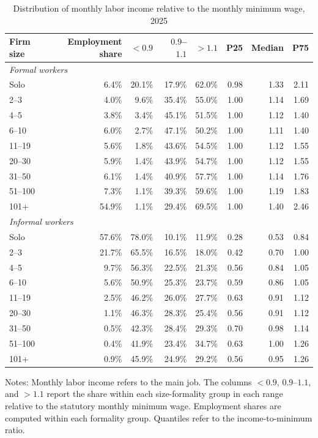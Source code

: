 \begin{table}[htbp]
  \centering
  \caption{Distribution of monthly labor income relative to the monthly minimum wage, 2025}
  \label{tab:minimum-wage-monthly-bunching-2025}
  \small
  \begin{tabular}{lrrrrrrr}
    \toprule
    Firm size & Employment share & $<0.9$ & $0.9$--$1.1$ & $>1.1$ & P25 & Median & P75 \\
    \midrule
    \multicolumn{8}{l}{\textit{Formal workers}} \\
    Solo & 6.4\% & 20.1\% & 17.9\% & 62.0\% & 0.98 & 1.33 & 2.11 \\
    2--3 & 4.0\% & 9.6\% & 35.4\% & 55.0\% & 1.00 & 1.14 & 1.69 \\
    4--5 & 3.8\% & 3.4\% & 45.1\% & 51.5\% & 1.00 & 1.12 & 1.40 \\
    6--10 & 6.0\% & 2.7\% & 47.1\% & 50.2\% & 1.00 & 1.11 & 1.40 \\
    11--19 & 5.6\% & 1.8\% & 43.6\% & 54.5\% & 1.00 & 1.12 & 1.55 \\
    20--30 & 5.9\% & 1.4\% & 43.9\% & 54.7\% & 1.00 & 1.12 & 1.55 \\
    31--50 & 6.1\% & 1.4\% & 40.9\% & 57.7\% & 1.00 & 1.14 & 1.76 \\
    51--100 & 7.3\% & 1.1\% & 39.3\% & 59.6\% & 1.00 & 1.19 & 1.83 \\
    101+ & 54.9\% & 1.1\% & 29.4\% & 69.5\% & 1.00 & 1.40 & 2.46 \\
    \midrule
    \multicolumn{8}{l}{\textit{Informal workers}} \\
    Solo & 57.6\% & 78.0\% & 10.1\% & 11.9\% & 0.28 & 0.53 & 0.84 \\
    2--3 & 21.7\% & 65.5\% & 16.5\% & 18.0\% & 0.42 & 0.70 & 1.00 \\
    4--5 & 9.7\% & 56.3\% & 22.5\% & 21.3\% & 0.56 & 0.84 & 1.05 \\
    6--10 & 5.6\% & 50.9\% & 25.3\% & 23.7\% & 0.59 & 0.86 & 1.05 \\
    11--19 & 2.5\% & 46.2\% & 26.0\% & 27.7\% & 0.63 & 0.91 & 1.12 \\
    20--30 & 1.1\% & 46.3\% & 28.3\% & 25.4\% & 0.56 & 0.91 & 1.12 \\
    31--50 & 0.5\% & 42.3\% & 28.4\% & 29.3\% & 0.70 & 0.98 & 1.14 \\
    51--100 & 0.4\% & 41.9\% & 23.4\% & 34.7\% & 0.63 & 1.00 & 1.26 \\
    101+ & 0.9\% & 45.9\% & 24.9\% & 29.2\% & 0.56 & 0.95 & 1.26 \\
    \bottomrule
  \end{tabular}
  \vspace{0.3em}
  \begin{minipage}{0.95\textwidth}
  \footnotesize
  Notes: Monthly labor income refers to the main job. The columns $<0.9$, $0.9$--$1.1$, and $>1.1$ report the share within each size-formality group in each range relative to the statutory monthly minimum wage. Employment shares are computed within each formality group. Quantiles refer to the income-to-minimum ratio.
  \end{minipage}
\end{table}
